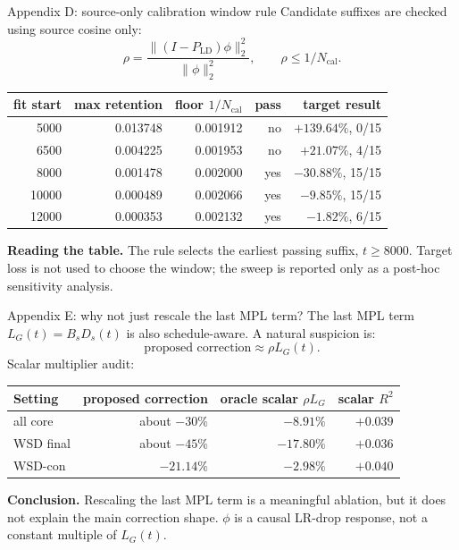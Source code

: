 \documentclass[9pt,aspectratio=169]{beamer}
\begin{document}
\begin{frame}{Appendix D: source-only calibration window rule}
\small
Candidate suffixes are checked using source cosine only:
\[
\rho=\frac{\|(I-P_{\mathrm{LD}})\phi\|_2^2}{\|\phi\|_2^2},
\qquad
\rho\le 1/N_{\mathrm{cal}}.
\]
\vfill
\begin{center}
\begin{tabular}{rrrrr}
\toprule
fit start & max retention & floor \(1/N_{\mathrm{cal}}\) & pass & target result\\
\midrule
5000 & 0.013748 & 0.001912 & no & \(+139.64\%\), 0/15\\
6500 & 0.004225 & 0.001953 & no & \(+21.07\%\), 4/15\\
8000 & 0.001478 & 0.002000 & yes & \(-30.88\%\), 15/15\\
10000 & 0.000489 & 0.002066 & yes & \(-9.85\%\), 15/15\\
12000 & 0.000353 & 0.002132 & yes & \(-1.82\%\), 6/15\\
\bottomrule
\end{tabular}
\end{center}
\vfill
\textbf{Reading the table.}
The rule selects the earliest passing suffix, \(t\ge8000\).
Target loss is not used to choose the window;
the sweep is reported only as a post-hoc sensitivity analysis.
\end{frame}

\begin{frame}{Appendix E: why not just rescale the last MPL term?}
\small
The last MPL term \(L_G(t)=B_sD_s(t)\) is also schedule-aware.
A natural suspicion is:
\[
\text{proposed correction}
\approx
\rho L_G(t).
\]
\vfill
Scalar multiplier audit:
\begin{center}\small
\begin{tabular}{lrrr}
\toprule
Setting & proposed correction & oracle scalar \( \rho L_G \) & scalar \(R^2\)\\
\midrule
all core & about \(-30\%\) & \(-8.91\%\) & \(+0.039\)\\
WSD final & about \(-45\%\) & \(-17.80\%\) & \(+0.036\)\\
WSD-con & \(-21.14\%\) & \(-2.98\%\) & \(+0.040\)\\
\bottomrule
\end{tabular}
\end{center}
\vfill
\textbf{Conclusion.}
Rescaling the last MPL term is a meaningful ablation,
but it does not explain the main correction shape.
\(\phi\) is a causal LR-drop response, not a constant multiple of \(L_G(t)\).
\end{frame}
\end{document}
